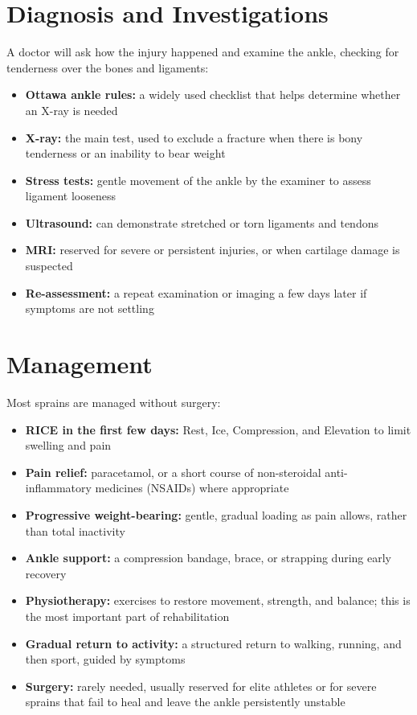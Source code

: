 \section*{Diagnosis and Investigations}
A doctor will ask how the injury happened and examine the ankle, checking for tenderness over the bones and ligaments:

\begin{itemize}
    \item \textbf{Ottawa ankle rules:} a widely used checklist that helps determine whether an X-ray is needed
    \item \textbf{X-ray:} the main test, used to exclude a fracture when there is bony tenderness or an inability to bear weight
    \item \textbf{Stress tests:} gentle movement of the ankle by the examiner to assess ligament looseness
    \item \textbf{Ultrasound:} can demonstrate stretched or torn ligaments and tendons
    \item \textbf{MRI:} reserved for severe or persistent injuries, or when cartilage damage is suspected
    \item \textbf{Re-assessment:} a repeat examination or imaging a few days later if symptoms are not settling
\end{itemize}

\section*{Management}
Most sprains are managed without surgery:

\begin{itemize}
    \item \textbf{RICE in the first few days:} Rest, Ice, Compression, and Elevation to limit swelling and pain
    \item \textbf{Pain relief:} paracetamol, or a short course of non-steroidal anti-inflammatory medicines (NSAIDs) where appropriate
    \item \textbf{Progressive weight-bearing:} gentle, gradual loading as pain allows, rather than total inactivity
    \item \textbf{Ankle support:} a compression bandage, brace, or strapping during early recovery
    \item \textbf{Physiotherapy:} exercises to restore movement, strength, and balance; this is the most important part of rehabilitation
    \item \textbf{Gradual return to activity:} a structured return to walking, running, and then sport, guided by symptoms
    \item \textbf{Surgery:} rarely needed, usually reserved for elite athletes or for severe sprains that fail to heal and leave the ankle persistently unstable
\end{itemize}

